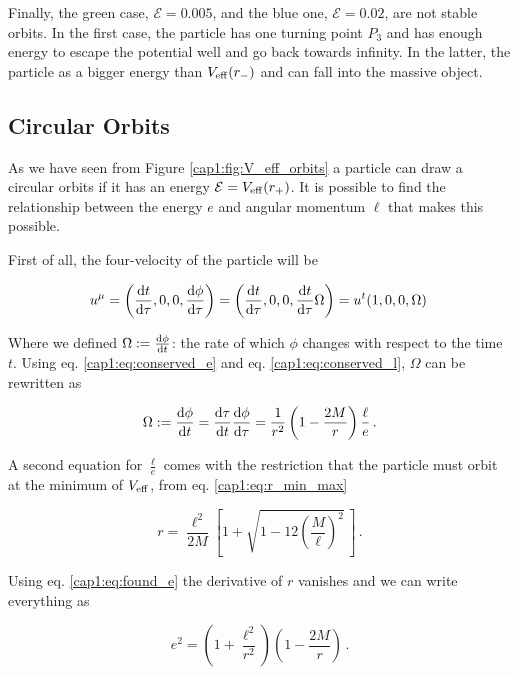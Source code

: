 Finally, the green case, $\mathcal E = 0.005$, and the blue one,
$\mathcal E = 0.02$, are not stable orbits.
In the first case, the particle has one turning point $P_3$ and has enough
energy to escape the potential well and go back towards infinity.
In the latter, the particle as a bigger energy than $V_{\rm eff} (r_-)$
and can fall into the massive object.


\subsection{Circular Orbits}
\label{cap1:ssec:circular_orbits}

As we have seen from Figure \ref{cap1:fig:V_eff_orbits} a particle can draw a
circular orbits if it has an energy $\mathcal E = V_{\rm eff}(r_+)$.
It is possible to find the relationship between the energy $e$
and angular momentum $\ell$ that makes this possible.

First of all, the four-velocity of the particle will be

\begin{equation}
    u^\mu = \left(\dv{t}{\tau}, 0, 0, \dv{\phi}{\tau} \right)
    = \left(\dv{t}{\tau}, 0, 0, \dv{t}{\tau} \Omega \right)
    = u^t (1, 0, 0, \Omega) \,
    \label{cap1:eq:circular_orbit_u}
\end{equation}

Where we defined $\Omega := \dv{\phi}{t}$: the rate of which $\phi$ changes with
respect to the \Sh time $t$.
Using eq. \ref{cap1:eq:conserved_e} and eq. \ref{cap1:eq:conserved_l}, $\Omega$
can be rewritten as

\begin{equation}
    \Omega := \dv{\phi}{t} = \dv{\tau}{t} \dv{\phi}{\tau} =
    \frac{1}{r^2} \left(1 - \frac{2M}{r} \right) \frac{\ell}{e}\, .
    \label{cap1:eq:Omega}
\end{equation}

A second equation for $\frac{\ell}{e}$ comes with the restriction that the
particle must orbit at the minimum of $V_{\rm eff}$, from eq.
\ref{cap1:eq:r_min_max}

\begin{equation}
    r = \frac{\ell^2}{2 M} \left[1 +
    \sqrt{1 - 12 \left( \frac{M}{\ell} \right)^2} \, \right] \, .
    \label{cap1:eq:r_min}
\end{equation}

Using eq. \ref{cap1:eq:found_e} the derivative of $r$ vanishes
and we can write everything as

\begin{equation}
    e^2 = \left(1 + \frac{\ell^2}{r^2} \right)
    \left(1 - \frac{2M}{r}\right) \, .
    \label{cap1:eq:circular_orbit1}
\end{equation}

